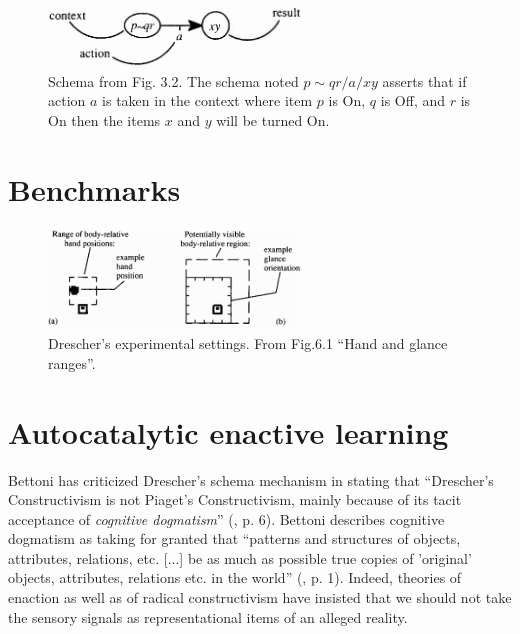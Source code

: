 \documentclass[runningheads]{llncs}
\begin{document}
\begin{figure}
	\centering
	\includegraphics[width=0.6\textwidth]{Figure_2_schema_drescher.png}
	\caption{Schema from \cite{drescher_made-up_1991} Fig. 3.2.
	The schema noted $p \!\sim\! qr/a/xy$ asserts that if action $a$ is taken in the context where item $p$ is On, $q$ is Off, and $r$ is On then the items $x$ and $y$ will be turned On.} 
	\label{fig:drescher}
\end{figure}

\cite{drescher_made-up_1991}
\cite{chaput_constructivist_2004}
\cite{perotto_computational_nodate} 
\cite{guerin_piagetian_2008}
\cite{wang_new_2012}

\section{Benchmarks}

\begin{figure}
	\centering
	\includegraphics[width=0.6\textwidth]{Figure_drescher_expe.png}
	\caption{Drescher's experimental settings. From \cite{drescher_made-up_1991} Fig.6.1 ``Hand and glance ranges''.} 
	\label{fig:drescher2}
\end{figure}



\section{Autocatalytic enactive learning}

Bettoni  has criticized Drescher's schema mechanism in stating that ``Drescher's Constructivism is not Piaget's Constructivism, mainly because of its tacit acceptance of \textit{cognitive dogmatism}'' (\cite{bettoni_made-up_1993}, p. 6).
Bettoni describes cognitive dogmatism as taking for granted that ``patterns and structures of objects, attributes, relations, etc. [...] be as much as possible true copies of 'original' objects, attributes, relations etc. in the world'' (\cite{bettoni_made-up_1993}, p. 1).
Indeed, theories of enaction as well as of radical constructivism have insisted that we should not take the sensory signals as representational items of an alleged reality. 
\end{document}
